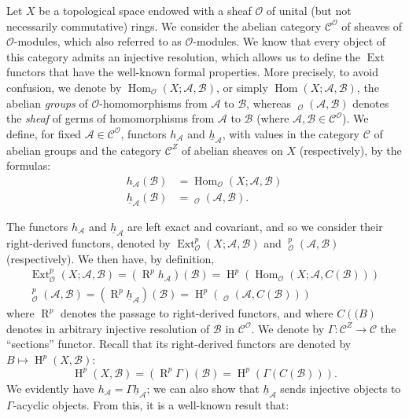 \documentclass{article}
\theoremstyle{plain}
\newcommand{\sh}{\mathscr}
\newcommand{\cat}{\mathcal}
\DeclareMathOperator{\Ext}{Ext}
\DeclareMathOperator{\Hom}{Hom}
\DeclareMathOperator{\shExt}{\underline{Ext}}
\DeclareMathOperator{\shHom}{\underline{Hom}}
\DeclareMathOperator{\RR}{R}
\DeclareMathOperator{\HH}{H}
\newcommand{\oldpage}[1]{\marginpar{\footnotesize$\Big\vert$ \textit{p.~#1}}}
\begin{document}
Let $X$ be a topological space endowed with a sheaf $\sh{O}$ of unital (but not necessarily commutative) rings.
We consider the abelian category $\cat{C}^\sh{O}$ of sheaves of $\sh{O}$-modules, which also referred to as $\sh{O}$-modules.
We know that every object of this category admits an injective resolution, which allows us to define the $\Ext$ functors that have the well-known formal properties.
More precisely, to avoid confusion, we denote by $\Hom_\sh{O}(X;\sh{A},\sh{B})$, or simply $\Hom(X;\sh{A},\sh{B})$, the abelian \emph{groups} of $\sh{O}$-homomorphisms from $\sh{A}$ to $\sh{B}$, whereas $\shHom_\sh{O}(\sh{A},\sh{B})$ denotes the \emph{sheaf} of germs of homomorphisms from $\sh{A}$ to $\sh{B}$ (where $\sh{A},\sh{B}\in \cat{C}^\sh{O}$).
We define, for fixed $\sh{A}\in \cat{C}^\sh{O}$, functors $h_\sh{A}$ and $\underline{h}_\sh{A}$, with values in the category $\cat{C}$ of abelian groups and the category $\cat{C}^Z$ of abelian sheaves on $X$ (respectively), by the formulas:
\[
\label{equation1.1}
  \begin{aligned}
    h_\sh{A}(\sh{B}) &= \Hom_\sh{O}(X;\sh{A},\sh{B})
  \\\underline{h}_\sh{A}(\sh{B}) &= \shHom_\sh{O}(\sh{A},\sh{B}).
  \end{aligned}
\tag{1.1}
\]

The functors $h_\sh{A}$ and $\underline{h}_\sh{A}$ are left exact and covariant, and so we consider their right-derived functors, denoted by $\Ext_\sh{O}^p(X;\sh{A},\sh{B})$ and $\shExt_\sh{O}^p(\sh{A},\sh{B})$ (respectively).
We then have, by definition,
\[
\label{equation1.2}
  \begin{gathered}
    \Ext_\sh{O}^p(X;\sh{A},\sh{B}) = (\RR^p h_\sh{A})(\sh{B}) = \HH^p(\Hom_\sh{O}(X;\sh{A},C(\sh{B})))
  \\\shExt_\sh{O}^p(\sh{A},\sh{B}) = (\RR^p \underline{h}_\sh{A})(\sh{B}) = \HH^p(\shHom_\sh{O}(\sh{A},C(\sh{B})))
  \end{gathered}
\tag{1.2}
\]
where $\RR^p$ denotes the passage to right-derived functors, and where $C(\sh(B)$ denotes in arbitrary injective resolution of $\sh{B}$ in $\cat{C}^\sh{O}$.
We denote by $\Gamma\colon\cat{C}^Z\to\cat{C}$ the ``sections'' functor.
Recall that its right-derived functors are denoted by $B\mapsto\HH^p(X,\sh{B})$:
\oldpage{149-02}
\[
\label{equation1.3}
  \HH^p(X,\sh{B}) = (\RR^p\Gamma)(\sh{B}) = \HH^p(\Gamma(C(\sh{B}))).
\tag{1.3}
\]
We evidently have $h_\sh{A}=\Gamma\underline{h}_\sh{A}$;
we can also show that $\underline{h}_\sh{A}$ sends injective objects to $\Gamma$-acyclic objects.
From this, it is a well-known result that:
\end{document}
